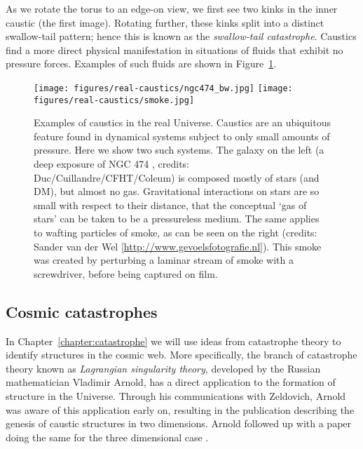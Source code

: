 As we rotate the torus to an edge-on view, we first see two kinks in the inner caustic (the first image). Rotating further, these kinks split into a distinct swallow-tail pattern; hence this is known as the \emph{swallow-tail catastrophe}. Caustics find a more direct physical manifestation in situations of fluids that exhibit no pressure forces. Examples of such fluids are shown in Figure~\ref{fig:realcaustics}.

\begin{figure}[t]
\centering
    \texttt{[image: figures/real-caustics/ngc474\_bw.jpg]}
    \texttt{[image: figures/real-caustics/smoke.jpg]}
    \caption{Examples of caustics in the real Universe. Caustics are an ubiquitous feature found in dynamical systems subject to only small amounts of pressure. Here we show two such systems. The galaxy on the left (a deep exposure of NGC 474 \citep{Duc2013}, credits: Duc/Cuillandre/CFHT/Coleum) is composed mostly of stars (and DM), but almost no gas. Gravitational interactions on stars are so small with respect to their distance, that the conceptual `gas of stars' can be taken to be a pressureless medium. The same applies to wafting particles of smoke, as can be seen on the right (credits: Sander van der Wel [\url{http://www.gevoelsfotografie.nl}]). This smoke was created by perturbing a laminar stream of smoke with a screwdriver, before being captured on film.} \label{fig:realcaustics}
\end{figure}


\subsection{Cosmic catastrophes}
In Chapter~\ref{chapter:catastrophe} we will use ideas from catastrophe theory to identify structures in the cosmic web. More specifically, the branch of catastrophe theory known as \emph{Lagrangian singularity theory}, developed by the Russian mathematician Vladimir Arnold, has a direct application to the formation of structure in the Universe. Through his communications with Zeldovich, Arnold was aware of this application early on, resulting in the publication \citet{Arnold1982} describing the genesis of caustic structures in two dimensions. Arnold followed up with a paper doing the same for the three dimensional case \citep{Arnold1986}.

